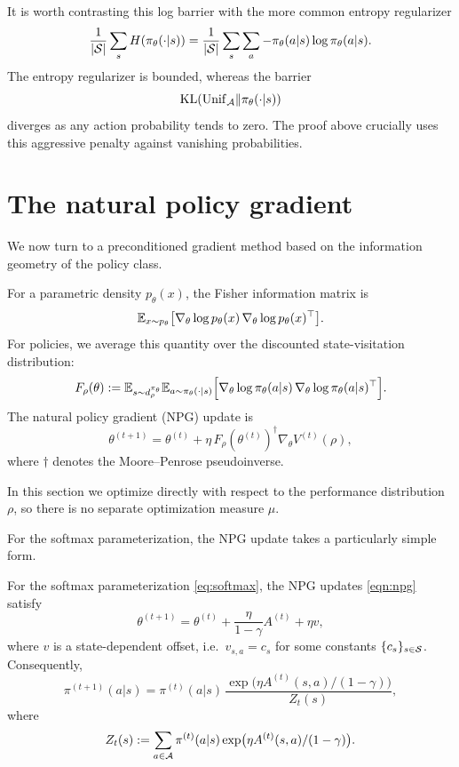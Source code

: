 It is worth contrasting this log barrier with the more common entropy regularizer
\[
\frac{1}{|\mathcal{S}|}\sum_s H(\pi_\theta(\cdot|s))
=
\frac{1}{|\mathcal{S}|}\sum_s \sum_a -\pi_\theta(a|s)\log \pi_\theta(a|s).
\]
The entropy regularizer is bounded, whereas the barrier
\[
\mathrm{KL}(\mathrm{Unif}_{\mathcal{A}}\|\pi_\theta(\cdot|s))
\]
diverges as any action probability tends to zero. The proof above crucially uses this
aggressive penalty against vanishing probabilities.

\section{The natural policy gradient}

We now turn to a preconditioned gradient method based on the information geometry
of the policy class.

For a parametric density $p_\theta(x)$, the Fisher information matrix is
\[
\mathbb{E}_{x\sim p_\theta}
\big[
\nabla_\theta \log p_\theta(x)\,\nabla_\theta \log p_\theta(x)^\top
\big].
\]
For policies, we average this quantity over the discounted state-visitation distribution:
\[
F_\rho(\theta)
:=
\mathbb{E}_{s\sim d_\rho^{\pi_\theta}}
\mathbb{E}_{a\sim \pi_\theta(\cdot|s)}
\Big[
\nabla_\theta \log \pi_\theta(a|s)\,
\nabla_\theta \log \pi_\theta(a|s)^\top
\Big].
\]
The natural policy gradient (NPG) update is
\begin{equation}\label{eqn:npg}
\theta^{(t+1)}
=
\theta^{(t)} + \eta\,F_\rho(\theta^{(t)})^\dagger \nabla_\theta V^{(t)}(\rho),
\end{equation}
where $\dagger$ denotes the Moore--Penrose pseudoinverse.

In this section we optimize directly with respect to the performance distribution $\rho$,
so there is no separate optimization measure $\mu$.

For the softmax parameterization, the NPG update takes a particularly simple form.

\begin{lemma}
\label{lemma:npg-softmax}
For the softmax parameterization \eqref{eq:softmax}, the NPG updates \eqref{eqn:npg} satisfy
\[
\theta^{(t+1)}
=
\theta^{(t)} + \frac{\eta}{1-\gamma}A^{(t)} + \eta v,
\]
where $v$ is a state-dependent offset, i.e.\ $v_{s,a}=c_s$ for some constants $\{c_s\}_{s\in\mathcal{S}}$.
Consequently,
\[
\pi^{(t+1)}(a|s)
=
\pi^{(t)}(a|s)\,
\frac{\exp\!\big(\eta A^{(t)}(s,a)/(1-\gamma)\big)}{Z_t(s)},
\]
where
\[
Z_t(s):=\sum_{a\in\mathcal{A}}\pi^{(t)}(a|s)\exp\!\big(\eta A^{(t)}(s,a)/(1-\gamma)\big).
\]
\end{lemma}

